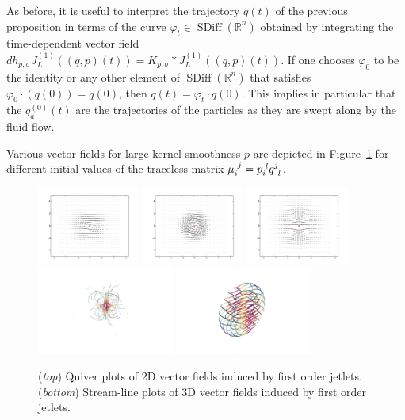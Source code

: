 \documentclass[12pt]{amsart}
\DeclareMathOperator{\SDiff}{SDiff}
\begin{document}
  As before, it is useful to interpret the trajectory $q(t)$ of the previous proposition in terms of the curve $\varphi_t \in  \SDiff(\mathbb{R}^n)$ obtained by integrating the time-dependent vector field $dh_{p, \sigma} J_L^{(1)}((q, p)(t)) = K_{p, \sigma} * J_L^{(1)}((q, p)(t))$. If one chooses $\varphi_0$ to be the identity or  any other element of $\SDiff(\mathbb{R}^n)$ that satisfies $\varphi_0 \cdot (q(0)) = q(0)$, then  $q(t) = \varphi_t \cdot  q(0)$. This implies in particular that the $q_a^{(0)}(t)$ are the trajectories of the particles as they are swept along by the fluid flow.

  Various vector fields for large kernel smoothness $p$
  are depicted in Figure~\ref{fig:zoo}
  for different initial values of the traceless matrix
  $\mu\indices{_i^j} = p\indices{_i^l} q\indices{^j_l}$.

  \begin{figure}
  	\centering
        \includegraphics[width=0.3\textwidth]{shear.pdf}
        \includegraphics[width=0.3\textwidth]{spin.pdf}
        \includegraphics[width=0.3\textwidth]{stretch.pdf}
        \\
        \includegraphics[width=0.4\textwidth]{stretch_3D.png}
        \includegraphics[width=0.4\textwidth]{shear_3D.png}
        \caption{(\emph{top}) Quiver plots of 2D vector fields induced by first order jetlets. 
        (\emph{bottom})   Stream-line plots of 3D vector fields induced by first order jetlets.}
        \label{fig:zoo}
  \end{figure}
\end{document}
